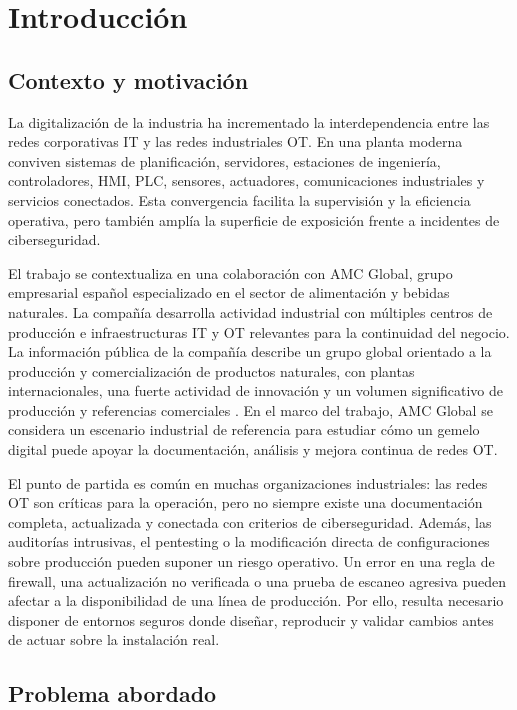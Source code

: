 \chapter{Introducción} \label{ch:introduccion}

\section{Contexto y motivación} \label{sec:contexto-motivacion}

La digitalización de la industria ha incrementado la interdependencia entre las redes corporativas IT y las redes industriales OT. En una planta moderna conviven sistemas de planificación, servidores, estaciones de ingeniería, controladores, HMI, PLC, sensores, actuadores, comunicaciones industriales y servicios conectados. Esta convergencia facilita la supervisión y la eficiencia operativa, pero también amplía la superficie de exposición frente a incidentes de ciberseguridad.

El trabajo se contextualiza en una colaboración con AMC Global, grupo empresarial español especializado en el sector de alimentación y bebidas naturales. La compañía desarrolla actividad industrial con múltiples centros de producción e infraestructuras IT y OT relevantes para la continuidad del negocio. La información pública de la compañía describe un grupo global orientado a la producción y comercialización de productos naturales, con plantas internacionales, una fuerte actividad de innovación y un volumen significativo de producción y referencias comerciales \cite{amcglobal,amcnatural}. En el marco del trabajo, AMC Global se considera un escenario industrial de referencia para estudiar cómo un gemelo digital puede apoyar la documentación, análisis y mejora continua de redes OT.

El punto de partida es común en muchas organizaciones industriales: las redes OT son críticas para la operación, pero no siempre existe una documentación completa, actualizada y conectada con criterios de ciberseguridad. Además, las auditorías intrusivas, el pentesting o la modificación directa de configuraciones sobre producción pueden suponer un riesgo operativo. Un error en una regla de firewall, una actualización no verificada o una prueba de escaneo agresiva pueden afectar a la disponibilidad de una línea de producción. Por ello, resulta necesario disponer de entornos seguros donde diseñar, reproducir y validar cambios antes de actuar sobre la instalación real.

\section{Problema abordado} \label{sec:problema-abordado}

